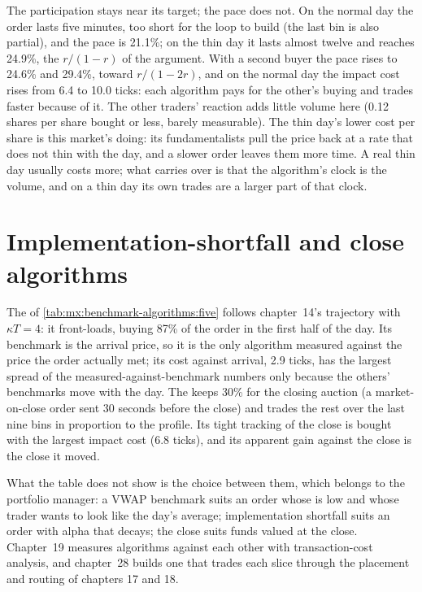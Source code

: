The participation stays near its target; the pace does not. On the normal day the order lasts five minutes, too short for the loop to build (the
last bin is also partial), and the pace is 21.1\%; on the thin day it lasts almost twelve and reaches 24.9\%, the $r/(1-r)$ of the argument. With a
second buyer the pace rises to 24.6\% and 29.4\%, toward $r/(1-2r)$, and on the normal day the impact cost rises from 6.4 to 10.0 ticks: each algorithm
pays for the other's buying and trades faster because of it. The other traders' reaction adds little volume here (0.12 shares per share bought or less,
barely measurable). The thin day's lower cost per share is this market's doing: its fundamentalists pull the price back at a rate that does not
thin with the day, and a slower order leaves them more time. A real thin day usually costs more; what carries over is that the algorithm's clock is
the volume, and on a thin day its own trades are a larger part of that clock.

\section{Implementation-shortfall and close algorithms}

The  of \cref{tab:mx:benchmark-algorithms:five} follows chapter~14's trajectory with $\kappa T=4$: it front-loads,
buying 87\% of the order in the first half of the day. Its benchmark is the arrival price, so it is the only algorithm measured against the price
the order actually met; its cost against arrival, 2.9 ticks, has the largest spread of the measured-against-benchmark numbers only because the others'
benchmarks move with the day. The  keeps 30\% for the closing auction (a market-on-close order sent 30 seconds before the
close) and trades the rest over the last nine bins in proportion to the profile. Its tight tracking of the close is bought with the largest impact
cost (6.8 ticks), and its apparent gain against the close is the close it moved.

What the table does not show is the choice between them, which belongs to the portfolio manager: a VWAP benchmark suits an order whose  is
low and whose trader wants to look like the day's average; implementation shortfall suits an order with alpha that decays; the close suits funds
valued at the close. Chapter~19 measures algorithms against each other with transaction-cost analysis, and chapter~28 builds one that trades each
slice through the placement and routing of chapters 17 and 18.

